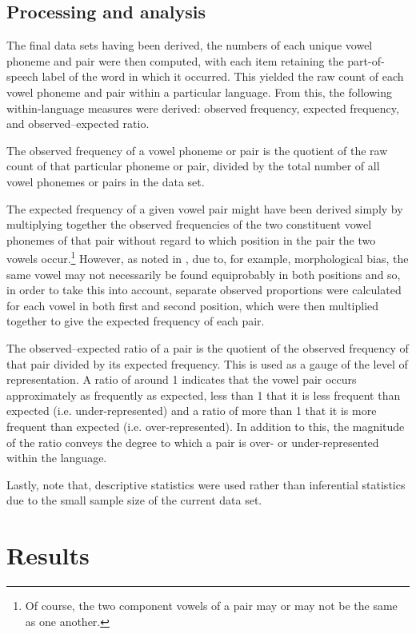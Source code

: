 \documentclass[output=paper]{langscibook}
\begin{document}
\subsection{Processing and analysis}

The final data sets having been derived, the numbers of each unique vowel pho\-neme and pair were then computed, with each item retaining the part-of-speech label of the word in which it occurred. This yielded the raw count of each vowel phoneme and pair within a particular language. From this, the following within-language measures were derived: observed frequency, expected frequency, and observed--expected ratio.

The observed frequency of a vowel phoneme or pair is the quotient of the raw count of that particular phoneme or pair, divided by the total number of all vowel phonemes or pairs in the data set.

The expected frequency of a given vowel pair might have been derived simply by multiplying together the observed frequencies of the two constituent vowel phonemes of that pair without regard to which position in the pair the two vowels occur.\footnote{Of course, the two component vowels of a pair may or may not be the same as one another.} However, as noted in \citet{Archangeli12a, Archangeli12b}, due to, for example, morphological bias, the same vowel may not necessarily be found equiprobably in both positions and so, in order to take this into account, separate observed proportions were calculated for each vowel in both first and second position, which were then multiplied together to give the expected frequency of each pair.

The observed--expected ratio of a pair is the quotient of the observed frequency of that pair divided by its expected frequency. This is used as a gauge of the level of representation. A ratio of around 1 indicates that the vowel pair occurs approximately as frequently as expected, less than 1 that it is less frequent than expected (i.e. under-represented) and a ratio of more than 1 that it is more frequent than expected (i.e. over-represented). In addition to this, the magnitude of the ratio conveys the degree to which a pair is over- or under-represented within the language.

Lastly, note that, descriptive statistics were used rather than inferential statistics due to the small sample size of the current data set.

\section{Results}\label{sec:nichols:results}\largerpage[2]
\end{document}
